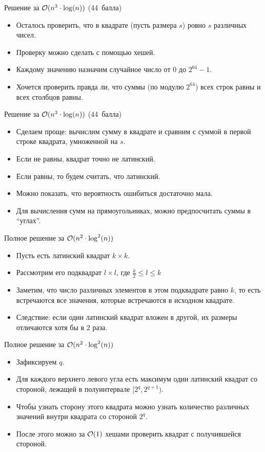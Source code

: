 \begin{frame}{Решение за $\mathcal{O}(n ^ 3 \cdot \log(n))$ (44~балла)}
  \begin{itemize}
  \item Осталось проверить, что в квадрате (пусть размера $s$) ровно $s$ различных чисел.
  \item Проверку можно сделать с помощью хешей.
  \item Каждому значению назначим случайное число от $0$ до $2^{64} - 1$.
  \item Хочется проверить правда ли, что суммы (по модулю $2^{64}$) всех строк равны и всех столбцов равны.
  \end{itemize}
\end{frame}

\begin{frame}{Решение за $\mathcal{O}(n ^ 3 \cdot \log(n))$ (44~балла)}
  \begin{itemize}
  \item Сделаем проще: вычислим сумму в квадрате и сравним с суммой в первой строке квадрата, умноженной на $s$.
  \item Если не равны, квадрат точно не латинский.
  \item Если равны, то будем считать, что латинский.
  \item Можно показать, что вероятность ошибиться достаточно мала.
  \item Для вычисления сумм на прямоугольниках, можно предпосчитать суммы в ``углах''.
  \end{itemize}
\end{frame}


\begin{frame}{Полное решение за $\mathcal{O}(n ^ 2 \cdot \log^2(n))$}
  \begin{itemize}
  \item Пусть есть латинский квадрат $k \times k$.
  \item Рассмотрим его подквадрат $l \times l$, где $\frac{k}{2} \le l \le k$
  \item Заметим, что число различных элементов в этом подквадрате равно $k$, то есть встречаются все значения, которые встречаются в исходном квадрате.
  \item Следствие: если один латинский квадрат вложен в другой, их размеры отличаются хотя бы в $2$ раза.
  \end{itemize}
\end{frame}

\begin{frame}{Полное решение за $\mathcal{O}(n ^ 2 \cdot \log^2(n))$}
  \begin{itemize}
  \item Зафиксируем $q$.
  \item Для каждого верхнего левого угла есть максимум один латинский квадрат со стороной, лежащей в полуинтервале $[2^q, 2^{q + 1})$.
  \item Чтобы узнать сторону этого квадрата можно узнать количество различных значений внутри квадрата со стороной $2^q$.
  \item После этого можно за $\mathcal{O}(1)$ хешами проверить квадрат с получившейся стороной.
  \end{itemize}
\end{frame}

